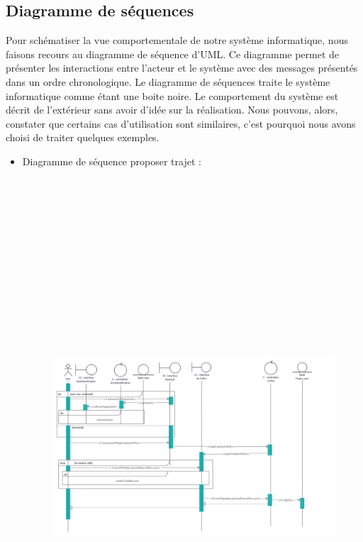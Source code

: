 \documentclass[a4paper]{report}
\begin{document}
\begin{spacing}{2}
\section{Diagramme de séquences}
Pour schématiser la vue comportementale de notre système informatique, nous faisons recours au diagramme de séquence d'UML. Ce diagramme permet de présenter les interactions
entre l'acteur et le système avec des messages présentés dans un ordre chronologique. Le
diagramme de séquences traite le système informatique comme étant une boite noire. Le
comportement du système est décrit de l'extérieur sans avoir d'idée sur la réalisation. Nous
pouvons, alors, constater que certains cas d'utilisation sont similaires, c'est pourquoi nous
avons choisi de traiter quelques exemples.
\cleardoublepage
\begin{itemize}
\item Diagramme de séquence proposer trajet :
\begin{figure}[!ht]
\begin{center}
\includegraphics[angle=90,height=20cm]{Projet_JEE/SDproposerTrajet.jpg}

\end{center}
\end{figure}
\end{itemize}
\end{spacing}
\end{document}
